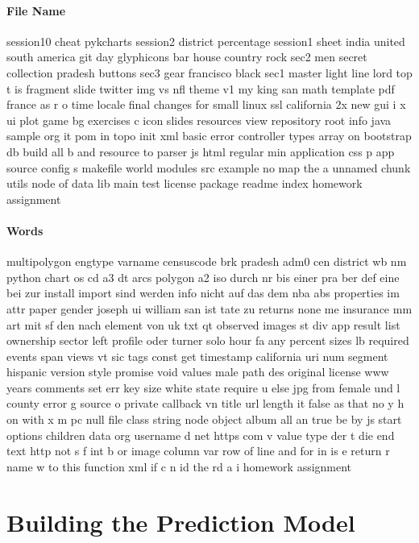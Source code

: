 \documentclass[paper=A4,pagesize=auto,12pt,headinclude=true,footinclude=true,BCOR=0mm,DIV=calc]{scrartcl}
\begin{document}
	\paragraph{File Name}
	session10 cheat pykcharts session2 district percentage session1 sheet india united south america git day glyphicons bar house country rock sec2 men secret collection pradesh buttons sec3 gear francisco black sec1 master light line lord top t is fragment slide twitter img vs nfl theme v1 my king san math template pdf france as r o time locale final changes for small linux ssl california 2x new gui i x ui plot game bg exercises c icon slides resources view repository root info java sample org it pom in topo init xml basic error controller types array on bootstrap db build all b and resource to parser js html regular min application css p app source config s makefile world modules src example no map the a unnamed chunk utils node of data lib main test license package readme index homework assignment 
	
	\paragraph{Words}
	multipolygon engtype varname censuscode brk pradesh adm0 cen district wb nm python chart os cd a3 dt arcs polygon a2 iso durch nr bis einer pra ber def eine bei zur install import sind werden info nicht auf das dem nba abs properties im attr paper gender joseph ui william san ist tate zu returns none me insurance mm art mit sf den nach element von uk txt qt observed images st div app result list ownership sector left profile oder turner solo hour fa any percent sizes lb required events span views vt sic tags const get timestamp california uri num segment hispanic version style promise void values male path des original license www years comments set err key size white state require u else jpg from female und l county error g source o private callback vn title url length it false as that no y h on with x m pc null file class string node object album all an true be by js start options children data org username d net https com v value type der t die end text http not s f int b or image column var row of line and for in is e return r name w to this function xml if c n id the rd a i homework assignment 
	
	\section{Building the Prediction Model}
	
\end{document}
